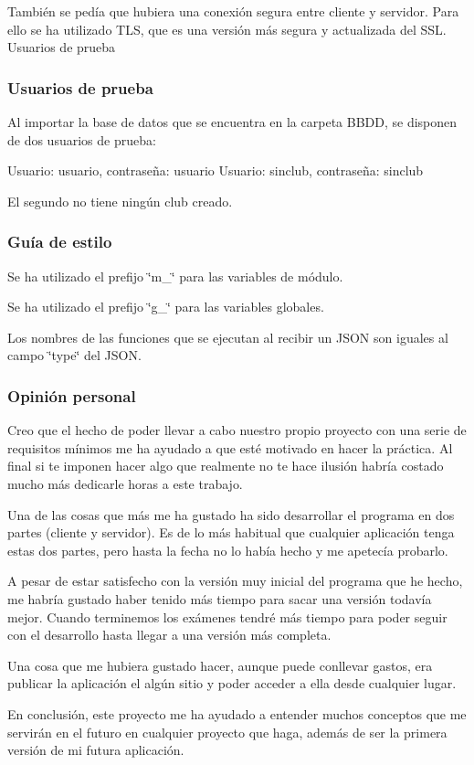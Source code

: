 También se pedía que hubiera una conexión segura entre cliente y servidor. Para ello se ha utilizado T\+LS, que es una versión más segura y actualizada del S\+SL. Usuarios de prueba

\subsubsection*{Usuarios de prueba}

Al importar la base de datos que se encuentra en la carpeta B\+B\+DD, se disponen de dos usuarios de prueba\+:

Usuario\+: usuario, contraseña\+: usuario Usuario\+: sinclub, contraseña\+: sinclub

El segundo no tiene ningún club creado.

\subsubsection*{Guía de estilo}


\begin{DoxyItemize}
\item Se ha utilizado el prefijo \char`\"{}m\+\_\+\char`\"{} para las variables de módulo.
\item Se ha utilizado el prefijo \char`\"{}g\+\_\+\char`\"{} para las variables globales.
\item Los nombres de las funciones que se ejecutan al recibir un J\+S\+ON son iguales al campo \char`\"{}type\char`\"{} del J\+S\+ON.
\end{DoxyItemize}

\subsubsection*{Opinión personal}

Creo que el hecho de poder llevar a cabo nuestro propio proyecto con una serie de requisitos mínimos me ha ayudado a que esté motivado en hacer la práctica. Al final si te imponen hacer algo que realmente no te hace ilusión habría costado mucho más dedicarle horas a este trabajo.

Una de las cosas que más me ha gustado ha sido desarrollar el programa en dos partes (cliente y servidor). Es de lo más habitual que cualquier aplicación tenga estas dos partes, pero hasta la fecha no lo había hecho y me apetecía probarlo.

A pesar de estar satisfecho con la versión muy inicial del programa que he hecho, me habría gustado haber tenido más tiempo para sacar una versión todavía mejor. Cuando terminemos los exámenes tendré más tiempo para poder seguir con el desarrollo hasta llegar a una versión más completa.

Una cosa que me hubiera gustado hacer, aunque puede conllevar gastos, era publicar la aplicación el algún sitio y poder acceder a ella desde cualquier lugar.

En conclusión, este proyecto me ha ayudado a entender muchos conceptos que me servirán en el futuro en cualquier proyecto que haga, además de ser la primera versión de mi futura aplicación.



 